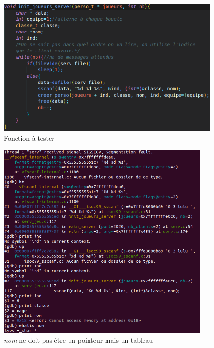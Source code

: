\documentclass[11pt]{article}
\begin{document}
        \begin{figure}[H]
            \centering
            \includegraphics[height=7cm]{fonction.png}
            \caption{Fonction à tester}
            \label{fig:Mob}
        \end{figure}
        \begin{figure}[H]
            \centering
            \includegraphics[height=10cm]{gdb.png}
            \caption{\textit{nom} ne doit pas être un pointeur mais un tableau}
        \end{figure}
\end{document}
